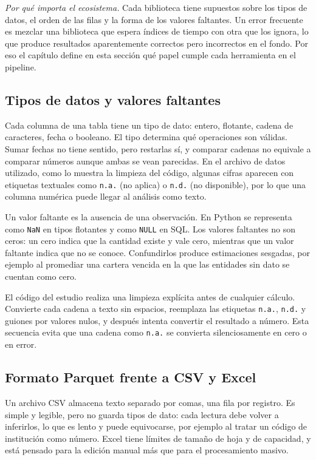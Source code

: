 \textit{Por qué importa el ecosistema.} Cada biblioteca tiene supuestos sobre los tipos de datos, el orden de las filas y la forma de los valores faltantes. Un error frecuente es mezclar una biblioteca que espera índices de tiempo con otra que los ignora, lo que produce resultados aparentemente correctos pero incorrectos en el fondo. Por eso el capítulo define en esta sección qué papel cumple cada herramienta en el pipeline.

\subsection{Tipos de datos y valores faltantes}
Cada columna de una tabla tiene un tipo de dato: entero, flotante, cadena de caracteres, fecha o booleano. El tipo determina qué operaciones son válidas. Sumar fechas no tiene sentido, pero restarlas sí, y comparar cadenas no equivale a comparar números aunque ambas se vean parecidas. En el archivo de datos utilizado, como lo muestra la limpieza del código, algunas cifras aparecen con etiquetas textuales como \texttt{n.a.} (no aplica) o \texttt{n.d.} (no disponible), por lo que una columna numérica puede llegar al análisis como texto.

Un valor faltante es la ausencia de una observación. En Python se representa como \texttt{NaN} en tipos flotantes y como \texttt{NULL} en SQL. Los valores faltantes no son ceros: un cero indica que la cantidad existe y vale cero, mientras que un valor faltante indica que no se conoce. Confundirlos produce estimaciones sesgadas, por ejemplo al promediar una cartera vencida en la que las entidades sin dato se cuentan como cero.

El código del estudio realiza una limpieza explícita antes de cualquier cálculo. Convierte cada cadena a texto sin espacios, reemplaza las etiquetas \texttt{n.a.}, \texttt{n.d.} y guiones por valores nulos, y después intenta convertir el resultado a número. Esta secuencia evita que una cadena como \texttt{n.a.} se convierta silenciosamente en cero o en error.

\subsection{Formato Parquet frente a CSV y Excel}
Un archivo CSV almacena texto separado por comas, una fila por registro. Es simple y legible, pero no guarda tipos de dato: cada lectura debe volver a inferirlos, lo que es lento y puede equivocarse, por ejemplo al tratar un código de institución como número. Excel tiene límites de tamaño de hoja y de capacidad, y está pensado para la edición manual más que para el procesamiento masivo.

